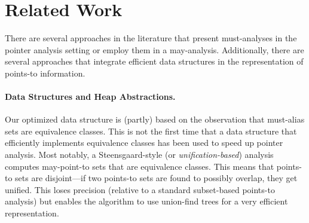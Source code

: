 

\section{Related Work}
\label{sec:related}

There are several approaches in the literature that present
must-analyses in the pointer analysis setting or employ them in a
may-analysis. Additionally, there are several approaches that
integrate efficient data structures in the representation of
points-to information.


\paragraph{Data Structures and Heap Abstractions.}
Our optimized data structure is (partly) based on the observation that
must-alias sets are equivalence classes. This is not the first time
that a data structure that efficiently implements equivalence classes
has been used to speed up pointer analysis. Most notably, a
Steensgaard-style (or \emph{unification-based})
\cite{popl:1996:Steensgaard} analysis computes may-point-to sets
that are equivalence classes. This means that points-to sets are
disjoint---if two points-to sets are found to possibly overlap, they
get unified. This loses precision (relative to a standard subset-based
points-to analysis) but enables the algorithm to use union-find trees
for a very efficient representation.

